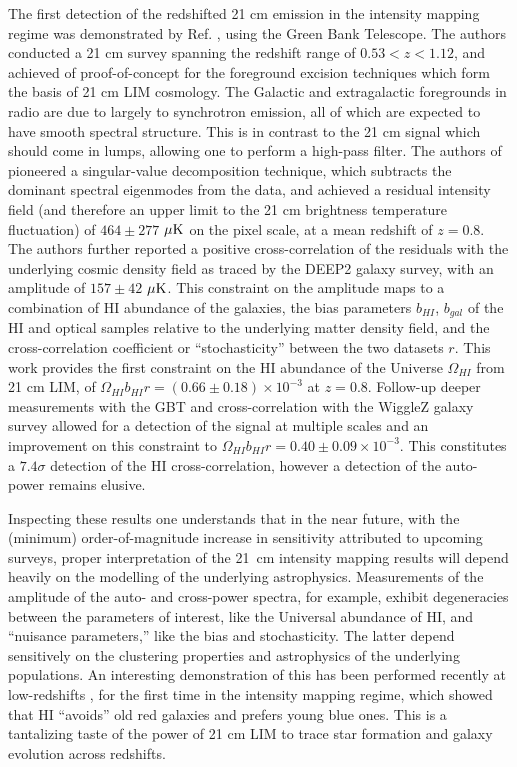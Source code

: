 The first detection of the redshifted 21 cm emission in the intensity mapping regime was demonstrated by Ref. \citep{changetal}, using the Green Bank Telescope. The authors conducted a 21 cm survey spanning the redshift range of $0.53 < z < 1.12$, and achieved of proof-of-concept for the foreground excision techniques which form the basis of 21 cm LIM cosmology. The Galactic and extragalactic foregrounds in radio are due to largely to synchrotron emission, all of which are expected to have smooth spectral structure. This is in contrast to the 21 cm signal which should come in lumps, allowing one to perform a high-pass filter. The authors of \citep{changetal} pioneered a singular-value decomposition technique, which subtracts the dominant spectral eigenmodes from the data, and achieved a residual intensity field (and therefore an upper limit to the 21 cm brightness temperature fluctuation) of $464 \pm 277$ ${\rm \mu K}$ on the pixel scale, at a mean redshift of $z=0.8$. The authors further reported a positive cross-correlation of the residuals with the underlying cosmic density field as traced by the DEEP2 galaxy survey, with an amplitude of $157 \pm 42$ ${\rm \mu K}$. This constraint on the amplitude maps to a combination of HI abundance of the galaxies, the bias parameters $b_{HI}$, $b_{gal}$ of the HI and optical samples relative to the underlying matter density field, and the cross-correlation coefficient or ``stochasticity'' between the two datasets $r$. This work provides the first constraint on the HI abundance of the Universe $\Omega_{HI}$ from 21 cm LIM, of $\Omega_{HI}b_{HI}r = (0.66 \pm 0.18) \times 10^{-3}$ at $z = 0.8$. Follow-up deeper measurements with the GBT \citep{masuietalgbt} and cross-correlation with the WiggleZ galaxy survey \citep{switzeretalgbt} allowed for a detection of the signal at multiple scales and an improvement on this constraint to $\Omega_{HI}b_{HI}r=0.40 \pm 0.09 \times 10^{-3}$. This constitutes a $7.4\sigma$ detection of the HI cross-correlation, however a detection of the auto-power remains elusive.

Inspecting these results one understands that in the near future, with the (minimum) order-of-magnitude increase in sensitivity attributed to upcoming surveys,  proper interpretation of the 21~cm intensity mapping results will depend heavily on the modelling of the underlying astrophysics. Measurements of the amplitude of the auto- and cross-power spectra, for example, exhibit degeneracies between the parameters of interest, like the Universal abundance of HI, and ``nuisance parameters,'' like the bias and stochasticity. The latter depend sensitively on the clustering properties and astrophysics of the underlying populations. An interesting demonstration of this has been performed recently at low-redshifts \citep{andersonetalparkes}, for the first time in the intensity mapping regime, which showed that HI ``avoids'' old red galaxies and prefers young blue ones. This is a tantalizing taste of the power of 21 cm LIM to trace star formation and galaxy evolution across redshifts. 

